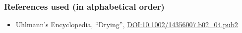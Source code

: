 \begin{frame}\frametitle{References used (in alphabetical order)}
	\begin{itemize}
		\item	Uhlmann's Encyclopedia, ``Drying'', {\tiny \href{http://dx.doi.org/10.1002/14356007.b02\_04.pub2}{DOI:10.1002/14356007.b02\_04.pub2}}
	\end{itemize}
\end{frame}